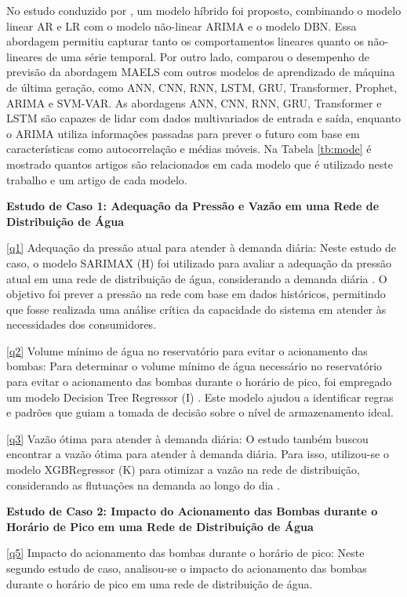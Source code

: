 No estudo conduzido por , um modelo híbrido foi proposto, combinando o modelo linear AR e LR com o modelo não-linear ARIMA e o modelo DBN. Essa abordagem permitiu capturar tanto os comportamentos lineares quanto os não-lineares de uma série temporal. Por outro lado,  comparou o desempenho de previsão da abordagem MAELS com outros modelos de aprendizado de máquina de última geração, como ANN, CNN, RNN, LSTM, GRU, Transformer, Prophet, ARIMA e SVM-VAR. As abordagens ANN, CNN, RNN, GRU, Transformer e LSTM são capazes de lidar com dados multivariados de entrada e saída, enquanto o ARIMA utiliza informações passadas para prever o futuro com base em características como autocorrelação e médias móveis. Na Tabela \ref{tb:mode} é mostrado quantos artigos são relacionados em cada modelo que é utilizado neste trabalho e um artigo de cada modelo.



\noindent\textbf{Estudo de Caso 1: Adequação da Pressão e Vazão em uma Rede de Distribuição de Água}

\eqref{q1} Adequação da pressão atual para atender à demanda diária: Neste estudo de caso, o modelo SARIMAX (H) foi utilizado para avaliar a adequação da pressão atual em uma rede de distribuição de água, considerando a demanda diária \cite{2-s2.0-85099424908}. O objetivo foi prever a pressão na rede com base em dados históricos, permitindo que fosse realizada uma análise crítica da capacidade do sistema em atender às necessidades dos consumidores.

\eqref{q2} Volume mínimo de água no reservatório para evitar o acionamento das bombas: Para determinar o volume mínimo de água necessário no reservatório para evitar o acionamento das bombas durante o horário de pico, foi empregado um modelo Decision Tree Regressor (I) \cite{2-s2.0-85054695177}. Este modelo ajudou a identificar regras e padrões que guiam a tomada de decisão sobre o nível de armazenamento ideal.

\eqref{q3} Vazão ótima para atender à demanda diária: O estudo também buscou encontrar a vazão ótima para atender à demanda diária. Para isso, utilizou-se o modelo XGBRegressor (K) para otimizar a vazão na rede de distribuição, considerando as flutuações na demanda ao longo do dia \cite{2-s2.0-85130441623}.

\noindent\textbf{Estudo de Caso 2: Impacto do Acionamento das Bombas durante o Horário de Pico em uma Rede de Distribuição de Água}

\eqref{q5} Impacto do acionamento das bombas durante o horário de pico: Neste segundo estudo de caso, analisou-se o impacto do acionamento das bombas durante o horário de pico em uma rede de distribuição de água.

